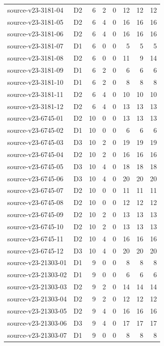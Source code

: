 \begin{longtable}{p{}lrrrrrr}
source-v23-3181-04 & D2 & 6 & 2 & 0 & 12 & 12 & 12\\
source-v23-3181-05 & D2 & 6 & 4 & 0 & 16 & 16 & 16\\
source-v23-3181-06 & D2 & 6 & 4 & 0 & 16 & 16 & 16\\
source-v23-3181-07 & D1 & 6 & 0 & 0 & 5 & 5 & 5\\
source-v23-3181-08 & D2 & 6 & 0 & 0 & 11 & 9 & 14\\
source-v23-3181-09 & D1 & 6 & 2 & 0 & 6 & 6 & 6\\
source-v23-3181-10 & D1 & 6 & 2 & 0 & 8 & 8 & 8\\
source-v23-3181-11 & D2 & 6 & 4 & 0 & 10 & 10 & 10\\
source-v23-3181-12 & D2 & 6 & 4 & 0 & 13 & 13 & 13\\
source-v23-6745-01 & D2 & 10 & 0 & 0 & 13 & 13 & 13\\
source-v23-6745-02 & D1 & 10 & 0 & 0 & 6 & 6 & 6\\
source-v23-6745-03 & D3 & 10 & 2 & 0 & 19 & 19 & 19\\
source-v23-6745-04 & D2 & 10 & 2 & 0 & 16 & 16 & 16\\
source-v23-6745-05 & D3 & 10 & 4 & 0 & 18 & 18 & 18\\
source-v23-6745-06 & D3 & 10 & 4 & 0 & 20 & 20 & 20\\
source-v23-6745-07 & D2 & 10 & 0 & 0 & 11 & 11 & 11\\
source-v23-6745-08 & D2 & 10 & 0 & 0 & 12 & 12 & 12\\
source-v23-6745-09 & D2 & 10 & 2 & 0 & 13 & 13 & 13\\
source-v23-6745-10 & D2 & 10 & 2 & 0 & 13 & 13 & 13\\
source-v23-6745-11 & D2 & 10 & 4 & 0 & 16 & 16 & 16\\
source-v23-6745-12 & D3 & 10 & 4 & 0 & 20 & 20 & 20\\
source-v23-21303-01 & D1 & 9 & 0 & 0 & 8 & 8 & 8\\
source-v23-21303-02 & D1 & 9 & 0 & 0 & 6 & 6 & 6\\
source-v23-21303-03 & D2 & 9 & 2 & 0 & 14 & 14 & 14\\
source-v23-21303-04 & D2 & 9 & 2 & 0 & 12 & 12 & 12\\
source-v23-21303-05 & D2 & 9 & 4 & 0 & 16 & 16 & 16\\
source-v23-21303-06 & D3 & 9 & 4 & 0 & 17 & 17 & 17\\
source-v23-21303-07 & D1 & 9 & 0 & 0 & 8 & 8 & 8\\

\end{longtable}

